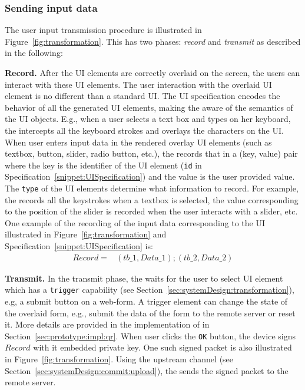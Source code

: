 \subsubsection{\bfseries Sending input data}\label{sec:systemDesign:commit:send}
The user input transmission procedure is illustrated in Figure~\ref{fig:transformation}. This has two phases: \emph{record} and \emph{transmit} as described in the following:

\begin{mylist}
\item \textbf{Record.} After the UI elements are correctly overlaid on the screen, the users can interact with these UI elements. The user interaction with the overlaid UI element is no different than a standard UI. The UI specification encodes the behavior of all the generated UI elements, making the \device aware of the semantics of the UI objects. E.g., when a user selects a text box and types on her keyboard, the \device intercepts all the keyboard strokes and overlays the characters on the UI.
When user enters input data in the rendered overlay UI elements (such as textbox, button, slider, radio button, etc.), the \device records that in a (key, value) pair where the key is the identifier of the UI element (\texttt{id} in Specification~\ref{snippet:UISpecification}) and the value is the user provided value. The \texttt{type} of the UI elements determine what information to record. For example, the \device records all the keystrokes when a textbox is selected, the value corresponding to the position of the slider is recorded when the user interacts with a slider, etc. One example of the recording of the input data corresponding to the UI illustrated in Figure~\ref{fig:transformation} and Specification~\ref{snippet:UISpecification} is: 
\begin{align*}
Record = & (tb\_1, Data\_1);(tb\_2,Data\_2)
\end{align*}

\item \textbf{Transmit.} In the transmit phase, the \device waits for the user to select UI element which has a \texttt{trigger} capability (see Section~\ref{sec:systemDesign:transformation}), e.g, a submit button on a web-form. A trigger element can change the state of the overlaid form, e.g., submit the data of the form to the remote server or reset it. More details are provided in the implementation of \name in Section~\ref{sec:prototype:impl:qr}. When user clicks the \texttt{OK} button, the device signs $Record$ with it embedded private key. One such signed packet is also illustrated in Figure~\ref{fig:transformation}. Using the upstream channel (see Section~\ref{sec:systemDesign:commit:upload}), the \device sends the signed packet to the remote server.
\end{mylist} 

